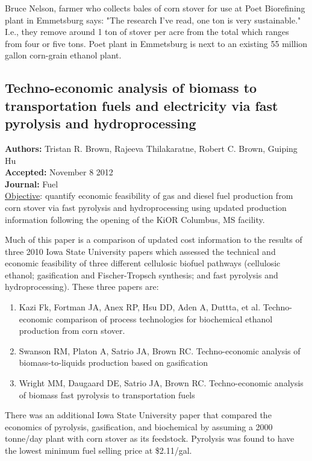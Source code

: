 \documentclass{article}\usepackage[]{graphicx}\usepackage[]{color}
\begin{document}
Bruce Nelson, farmer who collects bales of corn stover for use at Poet Biorefining plant in Emmetsburg says: "The research I've read, one ton is very sustainable."  I.e., they remove around 1 ton of stover per acre from the total which ranges from four or five tons.
Poet plant in Emmetsburg is next to an existing 55 million gallon corn-grain ethanol plant.

\subsection{Techno-economic analysis of biomass to transportation fuels and electricity via fast pyrolysis and hydroprocessing}
\textbf{Authors:} Tristan R. Brown, Rajeeva Thilakaratne, Robert C. Brown, Guiping Hu \\
\textbf{Accepted:} November 8 2012 \\
\textbf{Journal:} Fuel \\

\underline{Objective}: quantify economic feasibility of gas and diesel fuel production from corn stover via fast pyrolysis and hydroprocessing using updated production information following the opening of the KiOR Columbus, MS facility.

Much of this paper is a comparison of updated cost information to the results of three 2010 Iowa State University papers which assessed the technical and economic feasibility of three different cellulosic biofuel pathways (cellulosic ethanol; gasification and Fischer-Tropsch synthesis; and fast pyrolysis and hydroprocessing).  These three papers are:
\begin{enumerate}
\item Kazi Fk, Fortman JA, Anex RP, Hsu DD, Aden A, Duttta, et al.  Techno-economic comparison of process technologies for biochemical ethanol production from corn stover.
\item Swanson RM, Platon A, Satrio JA, Brown RC.  Techno-economic analysis of biomass-to-liquids production based on gasification
\item Wright MM, Daugaard DE, Satrio JA, Brown RC.  Techno-economic analysis of biomass fast pyrolysis to transportation fuels
\end{enumerate}

There was an additional Iowa State University paper that compared the economics of pyrolysis, gasification, and biochemical by assuming a 2000 tonne/day plant with corn stover as its feedstock.  Pyrolysis was found to have the lowest minimum fuel selling price at \$2.11/gal.
\end{document}
